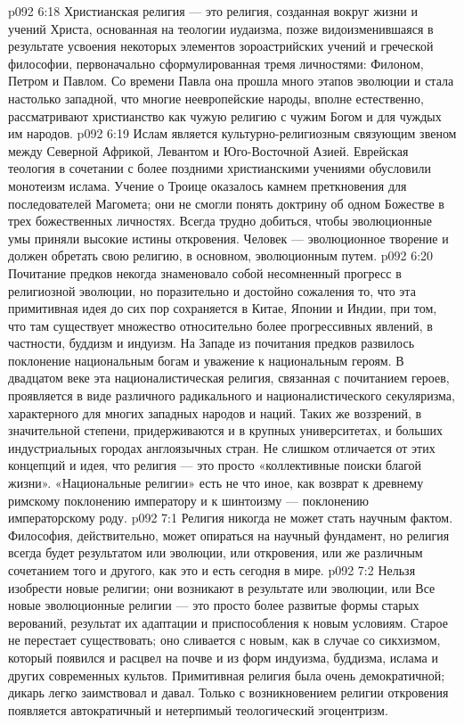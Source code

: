 \vs p092 6:18 Христианская религия --- это религия, созданная вокруг жизни и учений Христа, основанная на теологии иудаизма, позже видоизменившаяся в результате усвоения некоторых элементов зороастрийских учений и греческой философии, первоначально сформулированная тремя личностями: Филоном, Петром и Павлом. Со времени Павла она прошла много этапов эволюции и стала настолько западной, что многие неевропейские народы, вполне естественно, рассматривают христианство как чужую религию с чужим Богом и для чуждых им народов.
\vs p092 6:19 Ислам является культурно\hyp{}религиозным связующим звеном между Северной Африкой, Левантом и Юго\hyp{}Восточной Азией. Еврейская теология в сочетании с более поздними христианскими учениями обусловили монотеизм ислама. Учение о Троице оказалось камнем преткновения для последователей Магомета; они не смогли понять доктрину об одном Божестве в трех божественных личностях. Всегда трудно добиться, чтобы эволюционные умы  приняли высокие истины откровения. Человек --- эволюционное творение и должен обретать свою религию, в основном, эволюционным путем.
\vs p092 6:20 \pc Почитание предков некогда знаменовало собой несомненный прогресс в религиозной эволюции, но поразительно и достойно сожаления то, что эта примитивная идея до сих пор сохраняется в Китае, Японии и Индии, при том, что там существует множество относительно более прогрессивных явлений, в частности, буддизм и индуизм. На Западе из почитания предков развилось поклонение национальным богам и уважение к национальным героям. В двадцатом веке эта националистическая религия, связанная с почитанием героев, проявляется в виде различного радикального и националистического секуляризма, характерного для многих западных народов и наций. Таких же воззрений, в значительной степени, придерживаются и в крупных университетах, и больших индустриальных городах англоязычных стран. Не слишком отличается от этих концепций и идея, что религия --- это просто «коллективные поиски благой жизни». «Национальные религии» есть не что иное, как возврат к древнему римскому поклонению императору и к шинтоизму --- поклонению императорскому роду.
\vs p092 7:1 Религия никогда не может стать научным фактом. Философия, действительно, может опираться на научный фундамент, но религия всегда будет результатом или эволюции, или откровения, или же различным сочетанием того и другого, как это и есть сегодня в мире.
\vs p092 7:2 Нельзя изобрести новые религии; они возникают в результате или эволюции, или  Все новые эволюционные религии --- это просто более развитые формы старых верований, результат их адаптации и приспособления к новым условиям. Старое не перестает существовать; оно сливается с новым, как в случае со сикхизмом, который появился и расцвел на почве и из форм индуизма, буддизма, ислама и других современных культов. Примитивная религия была очень демократичной; дикарь легко заимствовал и давал. Только с возникновением религии откровения появляется автократичный и нетерпимый теологический эгоцентризм.
